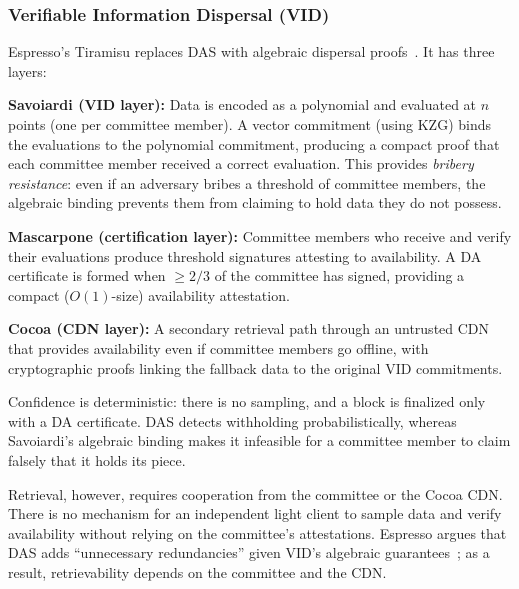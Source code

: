 \subsubsection{Verifiable Information Dispersal (VID)}

Espresso's Tiramisu replaces DAS with algebraic dispersal proofs~\cite{Espresso:Hotshot_and_Triamisu}.
It has three layers:

\squishlist
\item \textbf{Savoiardi (VID layer):} Data is encoded as a polynomial and evaluated at $n$ points (one per committee member). A vector commitment (using KZG) binds the evaluations to the polynomial commitment, producing a compact proof that each committee member received a correct evaluation. This provides \emph{bribery resistance}: even if an adversary bribes a threshold of committee members, the algebraic binding prevents them from claiming to hold data they do not possess.

\item \textbf{Mascarpone (certification layer):} Committee members who receive and verify their evaluations produce threshold signatures attesting to availability. A DA certificate is formed when $\geq 2/3$ of the committee has signed, providing a compact ($O(1)$-size) availability attestation.

\item \textbf{Cocoa (CDN layer):} A secondary retrieval path through an untrusted CDN that provides availability even if committee members go offline, with cryptographic proofs linking the fallback data to the original VID commitments.
\squishend

Confidence is deterministic: there is no sampling, and a block is finalized only with a DA certificate.
DAS detects withholding probabilistically, whereas Savoiardi's algebraic binding makes it infeasible for a committee member to claim falsely that it holds its piece.

Retrieval, however, requires cooperation from the committee or the Cocoa CDN.
There is no mechanism for an independent light client to sample data and verify availability without relying on the committee's attestations.
Espresso argues that DAS adds ``unnecessary redundancies'' given VID's algebraic guarantees~\cite{Espresso:Hotshot_and_Triamisu}; as a result, retrievability depends on the committee and the CDN.

